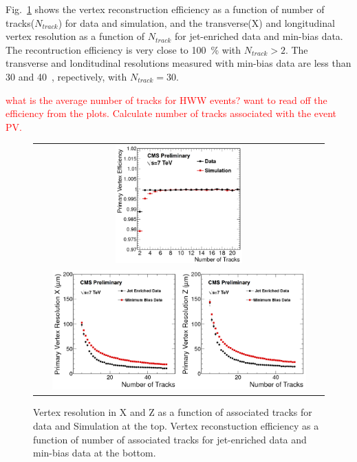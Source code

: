 Fig.~\ref{fig:VtxEff} shows the vertex reconstruction efficiency as a function 
of number of tracks($N_{track}$) for data and simulation, 
and the transverse(X) and longitudinal vertex resolution 
as a function of $N_{track}$ for jet-enriched data and min-bias data. 
The recontruction efficiency is very close to 100~\% with  
$N_{track}>2$. The transverse and londitudinal resolutions measured with 
min-bias data are less than 
30 and 40~\um, repectively, with $N_{track}=30$.

\textcolor{red}{what is the average 
number of tracks for HWW events? want to read off the efficiency from the plots. 
Calculate number of tracks associated with the event PV.}

\begin{figure}[htp] 
\centering 
\begin{tabular}{c} 
\includegraphics[width=0.45\textwidth]{figures/PrimaryVertexTagAndProbeEfficiency.png} \\ 
\includegraphics[width=0.9\textwidth]{figures/PrimaryVertexResolutions.png}  
\end{tabular} 
\caption{Vertex resolution in X and Z as a function of associated tracks
for data and Simulation at the top. 
Vertex reconstuction efficiency as a function of number of associated tracks
for jet-enriched data and min-bias data at the bottom. }
\label{fig:VtxEff} 
\end{figure} 

